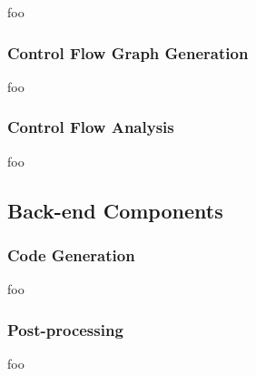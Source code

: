 


foo


\subsubsection{Control Flow Graph Generation}

foo


\subsubsection{Control Flow Analysis}





foo


\subsection{Back-end Components}


\subsubsection{Code Generation}

foo


\subsubsection{Post-processing}

foo
